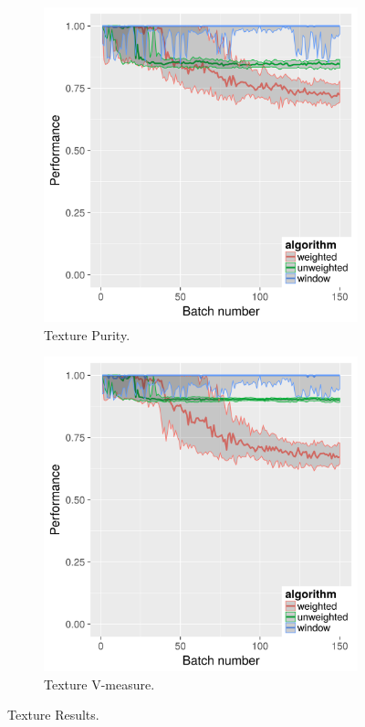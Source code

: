 \begin{figure}[h!]
\begin{subfigure}{.5\textwidth}
  \centering
  \includegraphics[width=1\linewidth]{texture/texture_with_weighted_ci_one_size_purity}
  \caption{Texture Purity.}
\end{subfigure}%
\begin{subfigure}{.5\textwidth}
  \centering
  \includegraphics[width=1\linewidth]{texture/texture_with_weighted_ci_one_size_vmeasure}
  \caption{Texture V-measure.}
\end{subfigure}
\caption{Texture Results.}
\label{fig:texture_results}
\end{figure}



